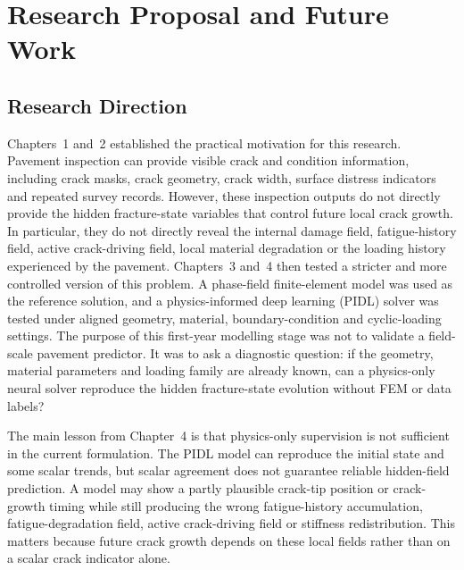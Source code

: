 \ifpdf
    \graphicspath{{Chapter5/Figs/PDF/}{Chapter5/Figs/Raster/}{Chapter5/Figs/}}
\else
    \graphicspath{{Chapter5/Figs/Vector/}{Chapter5/Figs/}}
\fi

\chapter{Research Proposal and Future Work}
\label{ch:research_plan_future_work}
\label{ch:future_work}

\section{Research Direction}

Chapters~1 and~2 established the practical motivation for this research.
Pavement inspection can provide visible crack and condition information, including crack masks, crack geometry, crack width, surface distress indicators and repeated survey records.
However, these inspection outputs do not directly provide the hidden fracture-state variables that control future local crack growth.
In particular, they do not directly reveal the internal damage field, fatigue-history field, active crack-driving field, local material degradation or the loading history experienced by the pavement.
Chapters~3 and~4 then tested a stricter and more controlled version of this problem.
A phase-field finite-element model was used as the reference solution, and a physics-informed deep learning (PIDL) solver was tested under aligned geometry, material, boundary-condition and cyclic-loading settings.
The purpose of this first-year modelling stage was not to validate a field-scale pavement predictor.
It was to ask a diagnostic question: if the geometry, material parameters and loading family are already known, can a physics-only neural solver reproduce the hidden fracture-state evolution without FEM or data labels?

The main lesson from Chapter~4 is that physics-only supervision is not sufficient in the current formulation.
The PIDL model can reproduce the initial state and some scalar trends, but scalar agreement does not guarantee reliable hidden-field prediction.
A model may show a partly plausible crack-tip position or crack-growth timing while still producing the wrong fatigue-history accumulation, fatigue-degradation field, active crack-driving field or stiffness redistribution.
This matters because future crack growth depends on these local fields rather than on a scalar crack indicator alone.

